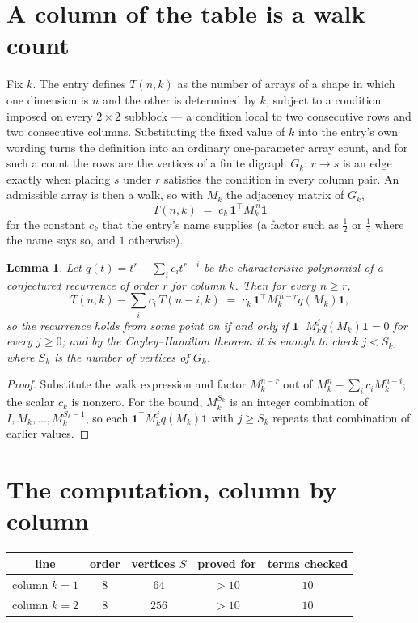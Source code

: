 \documentclass[11pt,a4paper]{article}
\theoremstyle{plain}
\newtheorem{lemma}[theorem]{Lemma}
\theoremstyle{definition}
\begin{document}
\section{A column of the table is a walk count}

Fix $k$. The entry defines $T(n,k)$ as the number of arrays of a shape in which one dimension
is $n$ and the other is determined by $k$, subject to a condition imposed on every
$2\times2$ subblock --- a condition local to two consecutive rows and two consecutive columns.
Substituting the fixed value of $k$ into the entry's own wording turns the definition into an
ordinary one-parameter array count, and for such a count the rows are the vertices of a finite
digraph $G_k$: $r\to s$ is an edge exactly when placing $s$ under $r$ satisfies the condition
in every column pair. An admissible array is then a walk, so with $M_k$ the adjacency matrix
of $G_k$,
\[
T(n,k)\;=\;c_k\,\mathbf{1}^{\!\top}M_k^{\,n}\mathbf{1}
\]
for the constant $c_k$ that the entry's name supplies (a factor such as $\tfrac12$ or
$\tfrac14$ where the name says so, and $1$ otherwise).

\begin{lemma}\label{lem:crit}
Let $q(t)=t^{r}-\sum_i c_it^{r-i}$ be the characteristic polynomial of a conjectured
recurrence of order $r$ for column $k$. Then for every $n\ge r$,
\[
T(n,k)-\sum_i c_i\,T(n-i,k)\;=\;c_k\,\mathbf{1}^{\!\top}M_k^{\,n-r}q(M_k)\mathbf{1},
\]
so the recurrence holds from some point on if and only if
$\mathbf{1}^{\!\top}M_k^{j}q(M_k)\mathbf{1}=0$ for every $j\ge0$; and by the
Cayley--Hamilton theorem it is enough to check $j<S_k$, where $S_k$ is the number of vertices
of $G_k$.
\end{lemma}

\begin{proof}
Substitute the walk expression and factor $M_k^{n-r}$ out of $M_k^{n}-\sum_ic_iM_k^{n-i}$;
the scalar $c_k$ is nonzero. For the bound, $M_k^{S_k}$ is an integer combination of
$I,M_k,\dots,M_k^{S_k-1}$, so each $\mathbf{1}^{\!\top}M_k^{j}q(M_k)\mathbf{1}$ with
$j\ge S_k$ repeats that combination of earlier values.
\end{proof}

\section{The computation, column by column}

\begin{center}
\begin{tabular}{ccccc}
line & order & vertices $S$ & proved for & terms checked \\ \hline
column $k$$=1$ & $8$ & $64$ & $>10$ & $10$ \\
column $k$$=2$ & $8$ & $256$ & $>10$ & $10$ \\
\end{tabular}
\end{center}
\end{document}
